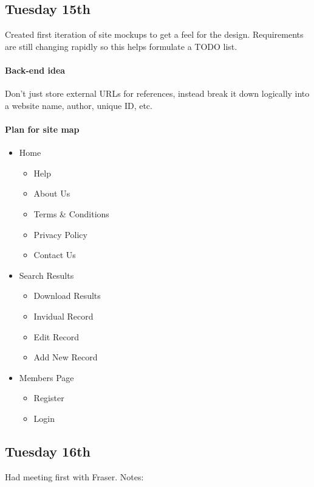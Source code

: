 \subsection{Tuesday 15th}
Created first iteration of site mockups to get a feel for the
design. Requirements are still changing rapidly so this helps formulate a TODO
list.

\paragraph{Back-end idea} Don’t just store external URLs for references, instead
break it down logically into a website name, author, unique ID, etc.

\paragraph{Plan for site map}
\begin{itemize}
\item Home
  \begin{itemize}
  \item Help
  \item About Us
  \item Terms \& Conditions
  \item Privacy Policy
  \item Contact Us
  \end{itemize}
\item Search Results
  \begin{itemize}
  \item Download Results
  \item Invidual Record
  \item Edit Record
  \item Add New Record
  \end{itemize}
\item Members Page
  \begin{itemize}
  \item Register
  \item Login
  \end{itemize}
\end{itemize}

\subsection{Tuesday 16th}
Had meeting first with Fraser. Notes:

